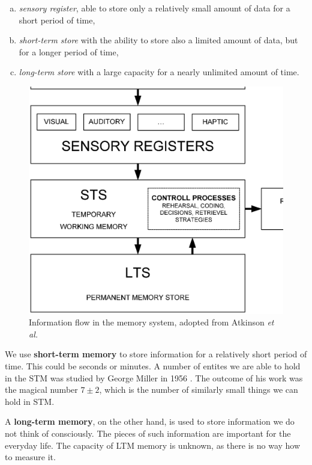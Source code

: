 \begin{enumerate}[(a)]
\item \emph{sensory register}, able to store only a relatively small amount of data for a short period of time,
\item \emph{short-term store} with the ability to store also a limited amount of data, but for a longer period of time,
\item \emph{long-term store} with a large capacity for a nearly unlimited amount of time.
\end{enumerate}

\begin{figure}
  \centering                                
  \includegraphics[scale=0.5]{diagrams/usedalgorithms/atkinson-memory.eps}    
  \caption{Information flow in the memory system, adopted from Atkinson \textit{et al.} \cite{Atkinson:controlofrtm}}
  \label{usedalgorithms:qttv}
\end{figure}

We use {\bf short-term memory} to store information for a relatively short period of time. This could be seconds or minutes. A number of entites we are able to hold in the STM was studied by George Miller in 1956 \cite{Sternberg:congitivepsychology}.  The outcome of his work was the magical number $7\pm 2$, which is the number of similarly small things we can hold in STM.

A \textbf{long-term memory}, on the other hand, is used to store information we do not think of consciously. The pieces of such information are important for the everyday life. The capacity of LTM memory is unknown, as there is no way how to measure it. 
                                               
